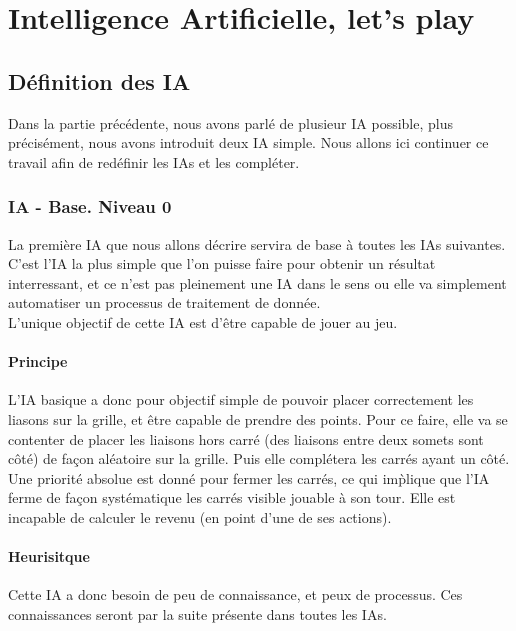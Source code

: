 \documentclass[a4paper,12pt]{report}
\begin{document}
\part{Intelligence Artificielle, let's play}
\chapter{D\'efinition des IA}

Dans la partie pr\'ec\'edente, nous avons parl\'e de plusieur IA possible, plus pr\'ecis\'ement, nous avons introduit deux IA simple. Nous allons ici continuer ce travail afin de red\'efinir les IAs et les compl\'eter.


\section{IA - Base. Niveau 0}

La premi\`ere IA que nous allons d\'ecrire servira de base \`a toutes les IAs suivantes. C'est l'IA la plus simple que l'on puisse faire pour obtenir un r\'esultat interressant, et ce n'est pas pleinement une IA dans le sens ou elle va simplement automatiser un processus de traitement de donn\'ee. \\
L'unique objectif de cette IA est d'\^etre capable de jouer au jeu.

\subsection{Principe}

L'IA basique a donc pour objectif simple de pouvoir placer correctement les liasons sur la grille, et \^etre capable de prendre des points. Pour ce faire, elle va se contenter de placer les liaisons hors carr\'e (des liaisons entre deux somets sont c\^ot\'e) de fa\c{c}on al\'eatoire sur la grille. Puis elle compl\'etera les carr\'es ayant un c\^ot\'e. Une priorit\'e absolue est donn\'e pour fermer les carr\'es, ce qui im\`plique que l'IA ferme de fa\c{c}on syst\'ematique les carr\'es visible jouable \`a son tour. Elle est incapable de calculer le revenu (en point d'une de ses actions).

\subsection{Heurisitque}

Cette IA a donc besoin de peu de connaissance, et peux de processus. Ces connaissances seront par la suite pr\'esente dans toutes les IAs. \\
\end{document}
